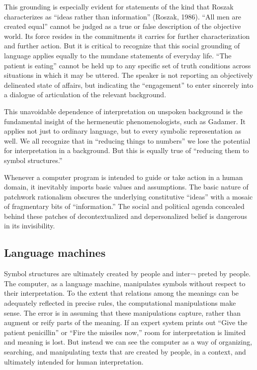 \documentclass[12pt]{article}
\begin{document}
This grounding is especially evident for statements of the kind that Roszak characterizes as ``ideas rather than information'' (Roszak, 1986). ``All men are created equal'' cannot be judged as a true or false description of the objective world. Its force resides in the commitments it carries for further characterization and further action. But it is critical to recognize that this social grounding of language applies equally to the mundane statements of everyday life. ``The patient is eating'' cannot be held up to any specific set of truth conditions across situations in which it may be uttered. The speaker is not reporting an objectively delineated state of affairs, but indicating the ``engagement'' to enter sincerely into a dialogue of articulation of the relevant background.

This unavoidable dependence of interpretation on unspoken background is the fundamental insight of the hermeneutic phenomenologists, such as Gadamer. It applies not just to ordinary language, but to every symbolic representation as well. We all recognize that in ``reducing things to numbers'' we lose the potential for interpretation in a background. But this is equally true of ``reducing them to symbol structures.''

Whenever a computer program is intended to guide or take action in a human domain, it inevitably imports basic values and assumptions. The basic nature of patchwork rationalism obscures the underlying constitutive ``ideas'' with a mosaic of fragmentary bits of ``information.'' The social and political agenda concealed behind these patches of decontextualized and depersonalized belief is dangerous in its invisibility.

\subsection{Language machines}

Symbol structures are ultimately created by people and inter¬ preted by people. The computer, as a language machine, manipulates symbols without respect to their interpretation. To the extent that relations among the meanings can be adequately reflected in precise rules, the computational manipulations make sense. The error is in assuming that these manipulations capture, rather than augment or reify parts of the meaning. If an expert system prints out ``Give the patient penicillin'' or ``Fire the missiles now,'' room for interpretation is limited and meaning is lost. But instead we can see the computer as a way of organizing, searching, and manipulating texts that are created by people, in a context, and ultimately intended for human interpretation.
\end{document}

